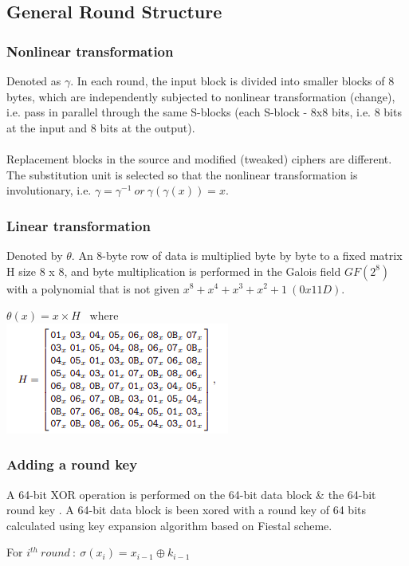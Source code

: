 \documentclass[preprint]{transcrypto}
\begin{document}
\subsection{General Round Structure}


    \subsubsection{Nonlinear transformation}
    Denoted as $\gamma$. In each round, the input block is divided into smaller blocks of 8 bytes, which are independently subjected to nonlinear transformation (change), i.e. pass in parallel through the same S-blocks (each S-block - 8x8 bits, i.e. 8 bits at the input and 8 bits at the output).\\ \\
    Replacement blocks in the source and modified (tweaked) ciphers are different. The substitution unit is selected so that the nonlinear transformation is involutionary, i.e. $\gamma = \gamma^{-1} \ or \ \gamma(\gamma(x)) = x.$
    
    
    \subsubsection{Linear transformation }
    Denoted by $\theta$. An 8-byte row of data is multiplied byte by byte to a fixed matrix H size 8 x 8, and byte multiplication is performed in the Galois field $GF(2^{8})$ with a polynomial that is not given $x^{8} + x^{4} + x^{3} + x^{2} +1 \ (0x11D)$.\cite{2}\\
    \begin{center}
            $\theta (x) = x \times H$ \ where\\ 
            \includegraphics[scale=0.5]{Screenshots/hbox.png}
    \end{center}
    
    
    \subsubsection{Adding a round key }
    A 64-bit XOR operation is performed on the 64-bit data block \& the 64-bit round key .
    A 64-bit data block is been xored with a round key of 64 bits calculated using key expansion algorithm based on Fiestal scheme.\\
   \begin{center}
       For $i^{th} \ round \ : \ \sigma (x_i) = x_{i-1} \oplus k_{i-1}$
   \end{center} 
\end{document}
